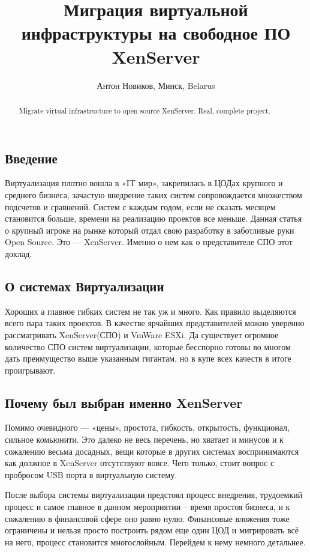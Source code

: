 \documentclass[10pt, a5paper]{article}
\begin{document}
\title{Миграция виртуальной инфраструктуры на свободное ПО XenServer }
\author{Антон Новиков, Минск, Belarus}
\maketitle
\begin{abstract}
Migrate virtual infrastructure to open source XenServer. Real, complete project.
\end{abstract}
\subsection*{Введение}
Виртуализация плотно вошла в «IT  мир», закрепилась в ЦОДах крупного и среднего бизнеса, зачастую внедрение таких систем сопровождается множеством подсчетов и сравнений. Систем с каждым годом, если не сказать месяцем становится больше, времени на реализацию проектов все меньше.
Данная статья о крупный игроке на рынке который отдал свою разработку в заботливые руки Open Source. Это — XenServer. Именно о нем как о представителе СПО этот доклад.

\subsection*{О системах Виртуализации}
Хороших а главное гибких систем не так уж и много. Как правило выделяются всего пара таких проектов. В качестве ярчайших представителей можно уверенно рассматривать XenServer(СПО) и VmWare ESXi. Да существует огромное количество СПО систем виртуализации, которые бесспорно готовы во многом дать преимущество выше указанным гигантам, но в купе всех качеств в итоге проигрывают.

\subsection*{Почему был выбран именно XenServer}
Помимо очевидного — «цены», простота, гибкость, открытость, функционал, сильное комьюнити.
Это далеко не весь перечень, но хватает и минусов и к сожалению весьма досадных, вещи которые в других системах воспринимаются как должное в XenServer отсутствуют вовсе.
Чего только, стоит вопрос с пробросом USB порта в виртуальную систему.

После выбора системы виртуализации предстоял процесс внедрения,  трудоемкий процесс и самое главное в данном мероприятии -- время простоя бизнеса, и к сожалению в финансовой сфере оно равно нулю. Финансовые вложения тоже ограничены и нельзя просто построить рядом еще один ЦОД и мигрировать всё на него, процесс становится многослойным. Перейдем к нему немного детальнее.
\end{document}

